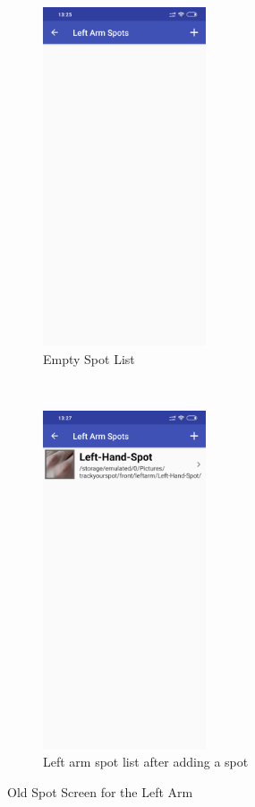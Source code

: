 \begin{figure}[t!]
    \centering
    \begin{subfigure}[t]{0.5\textwidth}
        \centering
        \includegraphics[height=10cm]{figures/spotlistempty_android.png}
        \caption{Empty Spot List}
    \end{subfigure}%
    ~
    \begin{subfigure}[t]{0.5\textwidth}
        \centering
        \includegraphics[height=10cm]{figures/spotlist_android.png}
        \caption{Left arm spot list after adding a spot}
    \end{subfigure}
    \caption{Old Spot Screen for the Left Arm}
\end{figure}

